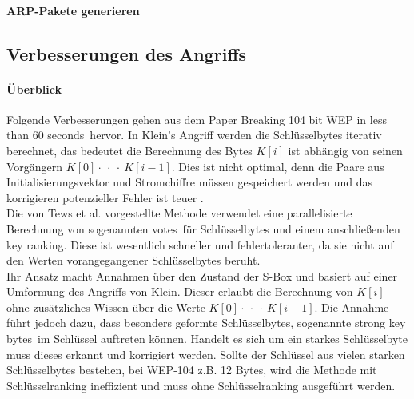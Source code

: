 \documentclass[10pt,a4paper]{article}
\begin{document}
\paragraph{ARP-Pakete generieren}

\subsection{Verbesserungen des Angriffs}
\paragraph{Überblick}
Folgende Verbesserungen gehen aus dem Paper \glqq Breaking 104 bit WEP in less than 60 seconds\grqq \cite{TWP07}\ hervor.
In Klein's Angriff werden die Schlüsselbytes iterativ berechnet, das bedeutet die Berechnung des Bytes $K[i]$ ist abhängig von seinen Vorgängern $K[0] \cdot\ \cdot\ \cdot\ K[i-1]$. Dies ist nicht optimal, denn die Paare aus Initialisierungsvektor und Stromchiffre müssen gespeichert werden und das korrigieren potenzieller Fehler ist teuer \cite[Kapitel 4]{TWP07}.\\ Die von Tews et al. vorgestellte Methode verwendet eine parallelisierte Berechnung von sogenannten \glqq votes\grqq\ für Schlüsselbytes und einem anschließenden \glqq key ranking\grqq. Diese ist wesentlich schneller und fehlertoleranter, da sie nicht auf den Werten vorangegangener Schlüsselbytes beruht.\\Ihr Ansatz macht Annahmen über den Zustand der S-Box und basiert auf einer Umformung des Angriffs von Klein. Dieser erlaubt die Berechnung von $K[i]$ ohne zusätzliches Wissen über die Werte $K[0] \cdot\ \cdot\ \cdot\ K[i-1]$. Die Annahme führt jedoch dazu, dass besonders geformte Schlüsselbytes, sogenannte \glqq strong key bytes\grqq\ im Schlüssel auftreten können. Handelt es sich um ein starkes Schlüsselbyte muss dieses erkannt und korrigiert werden. Sollte der Schlüssel aus vielen starken Schlüsselbytes bestehen, bei WEP-104 z.B. 12 Bytes, wird die Methode mit Schlüsselranking ineffizient und muss ohne Schlüsselranking ausgeführt werden.
\end{document}
